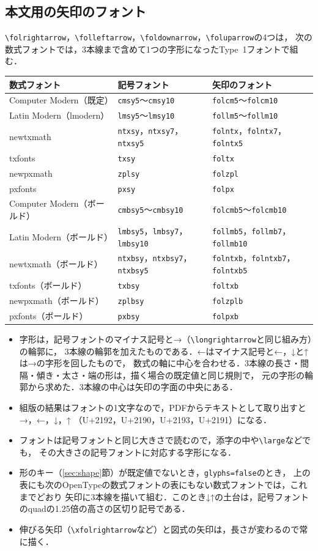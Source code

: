 \documentclass[dvipdfmx,paper=a4]{jlreq}
\newcommand\pkg[1]{\textsf{#1}}
\newcommand\file[1]{\texttt{#1}}
\begin{document}
\subsection{本文用の矢印のフォント}\label{sec:glyphs}
\verb|\folrightarrow|，\verb|\folleftarrow|，\verb|\foldownarrow|，\verb|\foluparrow|の4つは，
次の数式フォントでは，3本線まで含めて1つの字形になったType~1フォントで組む．
\begin{center}
\begin{tabular}{lll}
数式フォント & 記号フォント & 矢印のフォント\\\hline
Computer Modern（既定） & \file{cmsy5}〜\file{cmsy10} & \file{folcm5}〜\file{folcm10}\\
Latin Modern（\pkg{lmodern}） & \file{lmsy5}〜\file{lmsy10} & \file{follm5}〜\file{follm10}\\
\pkg{newtxmath} & \file{ntxsy}，\file{ntxsy7}，\file{ntxsy5} & \file{folntx}，\file{folntx7}，\file{folntx5}\\
\pkg{txfonts} & \file{txsy} & \file{foltx}\\
\pkg{newpxmath} & \file{zplsy} & \file{folzpl}\\
\pkg{pxfonts} & \file{pxsy} & \file{folpx}\\\hline
Computer Modern（ボールド） & \file{cmbsy5}〜\file{cmbsy10} & \file{folcmb5}〜\file{folcmb10}\\
Latin Modern（ボールド） & \file{lmbsy5}，\file{lmbsy7}，\file{lmbsy10} & \file{follmb5}，\file{follmb7}，\file{follmb10}\\
\pkg{newtxmath}（ボールド） & \file{ntxbsy}，\file{ntxbsy7}，\file{ntxbsy5} & \file{folntxb}，\file{folntxb7}，\file{folntxb5}\\
\pkg{txfonts}（ボールド） & \file{txbsy} & \file{foltxb}\\
\pkg{newpxmath}（ボールド） & \file{zplbsy} & \file{folzplb}\\
\pkg{pxfonts}（ボールド） & \file{pxbsy} & \file{folpxb}
\end{tabular}
\end{center}
\begin{itemize}
\item 字形は，記号フォントのマイナス記号と→（\verb|\longrightarrow|と同じ組み方）の輪郭に，
  3本線の輪郭を加えたものである．←はマイナス記号と←，↓と↑は→の字形を回したもので，
  数式の軸に中心を合わせる．3本線の長さ・間隔・傾き・太さ・端の形は，描く場合の既定値と同じ規則で，
  元の字形の輪郭から求めた．3本線の中心は矢印の字面の中央にある．
\item 組版の結果はフォントの1文字なので，PDFからテキストとして取り出すと→，←，↓，↑
  （U+2192，U+2190，U+2193，U+2191）になる．
\item フォントは記号フォントと同じ大きさで読むので，添字の中や\verb|\large|などでも，
  その大きさの記号フォントに対応する字形になる．
\item 形のキー（\ref{sec:shape}節）が既定値でないとき，\verb|glyphs=false|のとき，
  上の表にも次のOpenTypeの数式フォントの表にもない数式フォントでは，これまでどおり
  矢印に3本線を描いて組む．このとき↓↑の土台は，記号フォントのquadの1.25倍の高さの区切り記号である．
\item 伸びる矢印（\verb|\xfolrightarrow|など）と図式の矢印は，長さが変わるので常に描く．
\end{itemize}
\end{document}
